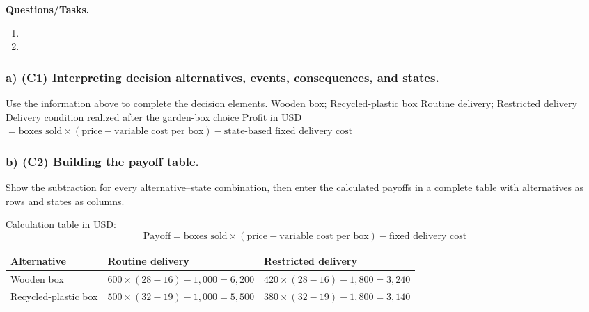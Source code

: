 \textbf{Questions/Tasks.}
\begin{enumerate}[label=\textbf{\alph*)}]
 \item {}
 \item {}
\end{enumerate}
\subsubsection*{a) \textbf{(C1)} Interpreting decision alternatives, events, consequences, and states.}
\label{subsec:problem15-neighborhood-garden-boxes-c1}
Use the information above to complete the decision elements.
\DecisionElementsTable
{Wooden box; Recycled-plastic box}
{Routine delivery; Restricted delivery}
{Delivery condition realized after the garden-box choice}
{Profit in USD $= \text{boxes sold} \times (\text{price} - \text{variable cost per box}) - \text{state-based fixed delivery cost}$}
\subsubsection*{b) \textbf{(C2)} Building the payoff table.}
\label{subsec:problem15-neighborhood-garden-boxes-c2}
Show the subtraction for every alternative--state combination, then enter the calculated payoffs in a complete table with alternatives as rows and states as columns.

Calculation table in USD:
\[
\text{Payoff}=\text{boxes sold}\times(\text{price}-\text{variable cost per box})-\text{fixed delivery cost}
\]
\begin{center}
\small
\begin{tabular}{lll}
\toprule
Alternative & Routine delivery & Restricted delivery \\
\midrule
Wooden box & $600 \times (28 - 16) - 1{,}000 = 6{,}200$ & $420 \times (28 - 16) - 1{,}800 = 3{,}240$ \\
Recycled-plastic box & $500 \times (32 - 19) - 1{,}000 = 5{,}500$ & $380 \times (32 - 19) - 1{,}800 = 3{,}140$ \\
\bottomrule
\end{tabular}
\end{center}

